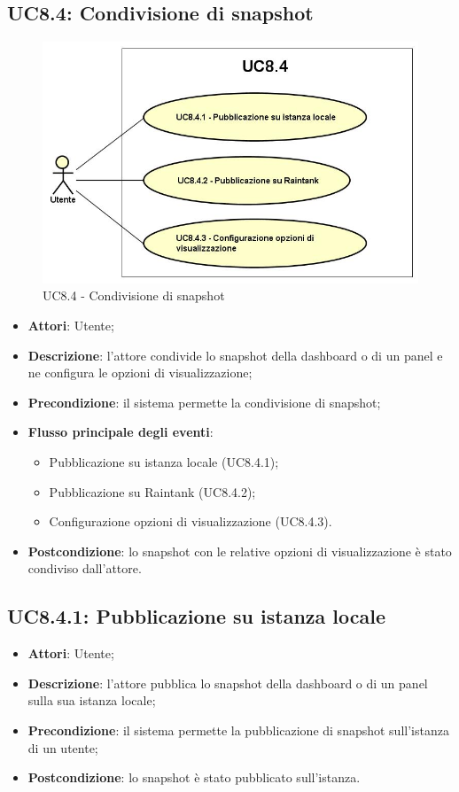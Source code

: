 \subsection{UC8.4: Condivisione di snapshot}
\hypertarget{UC8.4}{}
\begin{figure} [H]
	\centering
	\includegraphics[scale=0.45]{Img/UC8-4}
	\caption{UC8.4 - Condivisione di snapshot}\label{}
\end{figure}
\begin{itemize}
	\item \textbf{Attori}: Utente;
	\item \textbf{Descrizione}: l'attore condivide lo snapshot della dashboard o di un panel e ne configura le opzioni di visualizzazione;
	\item \textbf{Precondizione}: il sistema permette la condivisione di snapshot;
	\item \textbf{Flusso principale degli eventi}:
	\begin{itemize}
		\item Pubblicazione su istanza locale (UC8.4.1);
		\item Pubblicazione su Raintank (UC8.4.2);
		\item Configurazione opzioni di visualizzazione (UC8.4.3).
	\end{itemize}
	\item \textbf{Postcondizione}: lo snapshot con le relative opzioni di visualizzazione è stato condiviso dall'attore.
\end{itemize}

\subsection{UC8.4.1: Pubblicazione su istanza locale}
\hypertarget{UC8.4.1}{}
\begin{itemize}
	\item \textbf{Attori}: Utente;
	\item \textbf{Descrizione}: l'attore pubblica lo snapshot della dashboard o di un panel sulla sua istanza locale;
	\item \textbf{Precondizione}: il sistema permette la pubblicazione di snapshot sull'istanza di un utente;
	\item \textbf{Postcondizione}: lo snapshot è stato pubblicato sull'istanza.
\end{itemize}

